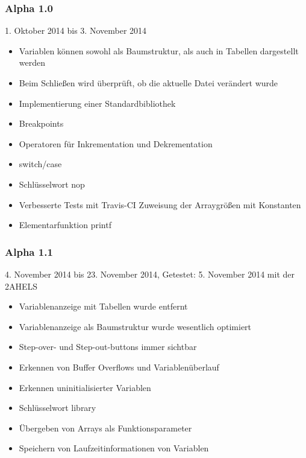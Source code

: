 \subsubsection*{Alpha 1.0}
1. Oktober 2014 bis 3. November 2014
\begin{itemize}
\item Variablen können sowohl als Baumstruktur, als auch in Tabellen dargestellt werden
\item Beim Schließen wird überprüft, ob die aktuelle Datei verändert wurde
\item Implementierung einer Standardbibliothek
\item Breakpoints
\item Operatoren für Inkrementation und Dekrementation
\item switch/case
\item Schlüsselwort \glqq nop\grqq
\item Verbesserte Tests mit Travis-CI
Zuweisung der Arraygrößen mit Konstanten
\item Elementarfunktion \glqq printf\grqq
\end{itemize}

\subsubsection*{Alpha 1.1}
4. November 2014 bis 23. November 2014,\newline
Getestet: 5. November 2014 mit der 2AHELS
\begin{itemize}
\item Variablenanzeige mit Tabellen wurde entfernt
\item Variablenanzeige als Baumstruktur wurde wesentlich optimiert
\item Step-over- und Step-out-buttons immer sichtbar
\item Erkennen von Buffer Overflows und Variablenüberlauf
\item Erkennen uninitialisierter Variablen
\item Schlüsselwort \glqq library\grqq
\item Übergeben von Arrays als Funktionsparameter
\item Speichern von Laufzeitinformationen von Variablen
\end{itemize}

